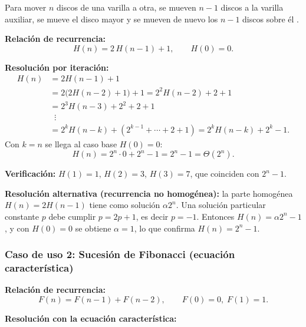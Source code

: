 \documentclass{article}
\begin{document}
        Para mover $n$ discos de una varilla a otra, se mueven $n-1$ discos a la
        varilla auxiliar, se mueve el disco mayor y se mueven de nuevo los $n-1$
        discos sobre él \citep{levitin2012}.
        
        \textbf{Relación de recurrencia:}
        \[
        H(n) = 2\,H(n-1) + 1, \qquad H(0) = 0.
        \]
        
        \textbf{Resolución por iteración:}
        \begin{align*}
        H(n) &= 2H(n-1) + 1 \\
            &= 2\bigl(2H(n-2) + 1\bigr) + 1 = 2^2 H(n-2) + 2 + 1 \\
            &= 2^3 H(n-3) + 2^2 + 2 + 1 \\
            &\;\;\vdots \\
            &= 2^k H(n-k) + \left(2^{k-1} + \cdots + 2 + 1\right) = 2^k H(n-k) + 2^k - 1.
        \end{align*}
        Con $k = n$ se llega al caso base $H(0) = 0$:
        \[
        H(n) = 2^n \cdot 0 + 2^n - 1 = 2^n - 1 = \Theta(2^n).
        \]
        
        \textbf{Verificación:} $H(1) = 1$, $H(2) = 3$, $H(3) = 7$, que coinciden con
        $2^n - 1$.
        
        \textbf{Resolución alternativa (recurrencia no homogénea):} la parte homogénea
        $H(n) = 2H(n-1)$ tiene como solución $\alpha 2^n$. Una solución particular
        constante $p$ debe cumplir $p = 2p + 1$, es decir $p = -1$. Entonces
        $H(n) = \alpha 2^n - 1$, y con $H(0) = 0$ se obtiene $\alpha = 1$, lo que
        confirma $H(n) = 2^n - 1$.
        
        \subsubsection{Caso de uso 2: Sucesión de Fibonacci (ecuación característica)}
        
        \textbf{Relación de recurrencia:}
        \[
        F(n) = F(n-1) + F(n-2), \qquad F(0) = 0,\; F(1) = 1.
        \]
        
        \textbf{Resolución con la ecuación característica:}
        
\end{document}
